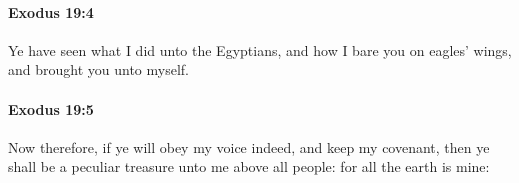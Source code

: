 		\paragraph{Exodus 19:4} %
			\label{EXODUS-19-4}

			Ye have seen what I did unto the Egyptians, and how I bare you on eagles' wings, and brought you unto myself.


		\paragraph{Exodus 19:5} %
			\label{EXODUS-19-5}

			Now therefore, if ye will obey my voice indeed, and keep my covenant, then ye shall be a peculiar treasure unto me above all people: for all the earth is mine:


